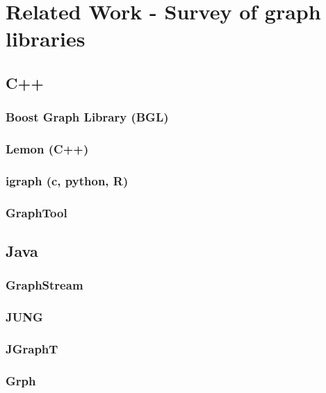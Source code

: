 \chapter{Related Work - Survey of graph libraries}
\label{ch:related_work}



\section{C++}
\label{sect:cpp}

	\subsection{Boost Graph Library (BGL)}
	\label{ssect:bgl}
	
	\subsection{Lemon (C++)}
	\label{ssect:lemon}
	
	\subsection{igraph (c, python, R)}
	\label{ssect:igraph}
	
	\subsection{GraphTool}
	\label{ssect:graphtool}



\section{Java}
\label{sect:java}

	\subsection{GraphStream}
	\label{ssect:graphStream}
	
	\subsection{JUNG}
	\label{ssect:jung}
	
	\subsection{JGraphT}
	\label{ssect:jgrapht}
	
	\subsection{Grph}
	\label{ssect:grph}



